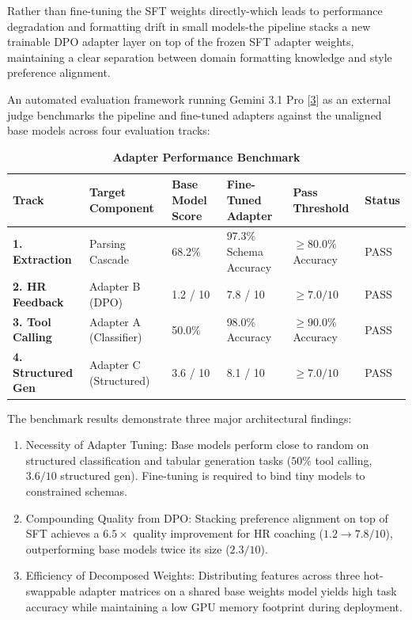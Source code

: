 \documentclass[12pt, a4paper]{report}
\begin{document}
Rather than fine-tuning the SFT weights directly-which leads to performance degradation and formatting drift in small models-the pipeline stacks a new trainable DPO adapter layer on top of the frozen SFT adapter weights, maintaining a clear separation between domain formatting knowledge and style preference alignment.

\vspace{0.6cm}
\vspace{0.4cm}

An automated evaluation framework running Gemini 3.1 Pro [\hyperlink{cite3}{3}] as an external judge benchmarks the pipeline and fine-tuned adapters against the unaligned base models across four evaluation tracks:

\begin{table}[H]
    \centering
    \caption[Adapter Performance Benchmark]{\textbf{Adapter Performance Benchmark}}
    \vspace{0.2cm}
    \normalsize
    \renewcommand{\arraystretch}{1.3}
    \begin{tabularx}{\textwidth}{Z{0.9} | Z{1.3} | Z{0.9} | Z{1.1} | Z{1.1} | Z{0.7}}
    \hline\hline
    Track & Target Component & Base Model Score & Fine-Tuned Adapter & Pass Threshold & Status \\
    \hline
    \textbf{1. Extraction} & Parsing Cascade & 68.2\% & 97.3\% Schema Accuracy & $\ge 80.0\%$ Accuracy & PASS \\
    \textbf{2. HR Feedback} & Adapter B (DPO) & 1.2 / 10 & 7.8 / 10 & $\ge 7.0 / 10$ & PASS \\
    \textbf{3. Tool Calling} & Adapter A (Classifier) & 50.0\% & 98.0\% Accuracy & $\ge 90.0\%$ Accuracy & PASS \\
    \textbf{4. Structured Gen} & Adapter C (Structured) & 3.6 / 10 & 8.1 / 10 & $\ge 7.0 / 10$ & PASS \\
    \hline\hline
    \end{tabularx}
\end{table}

The benchmark results demonstrate three major architectural findings:
\begin{enumerate}
    \item Necessity of Adapter Tuning: Base models perform close to random on structured classification and tabular generation tasks ($50\%$ tool calling, $3.6/10$ structured gen). Fine-tuning is required to bind tiny models to constrained schemas.
    \item Compounding Quality from DPO: Stacking preference alignment on top of SFT achieves a $6.5\times$ quality improvement for HR coaching ($1.2 \rightarrow 7.8/10$), outperforming base models twice its size ($2.3/10$).
    \item Efficiency of Decomposed Weights: Distributing features across three hot-swappable adapter matrices on a shared base weights model yields high task accuracy while maintaining a low GPU memory footprint during deployment.
\end{enumerate}
\end{document}

